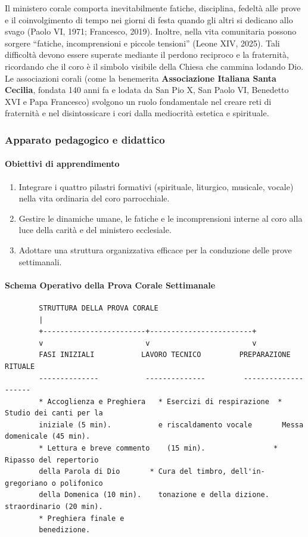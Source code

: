 \documentclass[12pt,a4paper]{article}
\begin{document}
	Il ministero corale comporta inevitabilmente fatiche, disciplina, fedeltà alle prove e il coinvolgimento di tempo nei giorni di festa quando gli altri si dedicano allo svago (Paolo VI, 1971; Francesco, 2019). Inoltre, nella vita comunitaria possono sorgere ``fatiche, incomprensioni e piccole tensioni'' (Leone XIV, 2025). Tali difficoltà devono essere superate mediante il perdono reciproco e la fraternità, ricordando che il coro è il simbolo visibile della Chiesa che cammina lodando Dio. Le associazioni corali (come la benemerita \textbf{Associazione Italiana Santa Cecilia}, fondata 140 anni fa e lodata da San Pio X, San Paolo VI, Benedetto XVI e Papa Francesco) svolgono un ruolo fondamentale nel creare reti di fraternità e nel disintossicare i cori dalla mediocrità estetica e spirituale.
	
	\subsubsection{Apparato pedagogico e didattico}\label{apparato-pedagogico-e-didattico-12}
	
	\paragraph{Obiettivi di apprendimento}\label{obiettivi-di-apprendimento-12}
	
	\begin{enumerate}[label=\arabic*.,leftmargin=*]
		\item Integrare i quattro pilastri formativi (spirituale, liturgico, musicale, vocale) nella vita ordinaria del coro parrocchiale.
		\item Gestire le dinamiche umane, le fatiche e le incomprensioni interne al coro alla luce della carità e del ministero ecclesiale.
		\item Adottare una struttura organizzativa efficace per la conduzione delle prove settimanali.
	\end{enumerate}
	
	\paragraph{Schema Operativo della Prova Corale Settimanale}\label{schema-operativo-della-prova-corale-settimanale}
	
	\begin{verbatim}
		STRUTTURA DELLA PROVA CORALE
		|
		+------------------------+------------------------+
		v                        v                        v
		FASI INIZIALI           LAVORO TECNICO         PREPARAZIONE RITUALE
		--------------           --------------         --------------------
		* Accoglienza e Preghiera   * Esercizi di respirazione  * Studio dei canti per la
		iniziale (5 min).           e riscaldamento vocale       Messa domenicale (45 min).
		* Lettura e breve commento    (15 min).                * Ripasso del repertorio
		della Parola di Dio       * Cura del timbro, dell'in-  gregoriano o polifonico
		della Domenica (10 min).    tonazione e della dizione.   straordinario (20 min).
		* Preghiera finale e
		benedizione.
	\end{verbatim}
	
\end{document}

